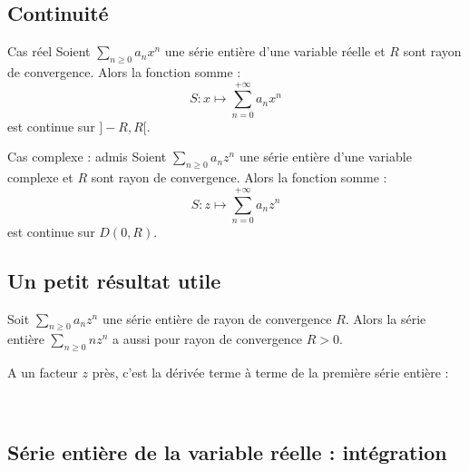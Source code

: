 \documentclass[french,11pt,twoside]{VcCours}
\begin{document}
\subsection{Continuité}

\begin{Theoreme}{Cas réel} Soient $\sum_{n \geq 0} a_n x^n$ une série entière d'une variable réelle et $R$ sont rayon de convergence. Alors la fonction somme :
$$ S : x \mapsto \sum_{n=0}^{+ \infty} a_n x^n $$
est continue sur $]-R,R[$.
\end{Theoreme}

\begin{Demonstration}{}
\vspace*{ 4cm}
\end{Demonstration}

\begin{Theoreme}{Cas complexe : admis} Soient $\sum_{n \geq 0} a_n z^n$ une série entière d'une variable complexe et $R$ sont rayon de convergence. Alors la fonction somme :
$$ S : z \mapsto \sum_{n=0}^{+ \infty} a_n z^n $$
est continue sur $D(0,R)$.
\end{Theoreme}

\subsection{Un petit résultat utile}

\begin{Proposition}{} Soit $\sum_{n \geq 0} a_n z^n$ une série entière de rayon de convergence $R$. Alors la série entière $\sum_{n \geq 0} n z^n$ a aussi pour rayon de convergence $R>0$.
\end{Proposition}

\begin{Remarque}{} A un facteur $z$ près, c'est la \og{} dérivée terme à terme \fg de la première série entière :

\vspace*{3cm}~
\end{Remarque}

\begin{Demonstration}{}

\newpage

\vspace*{ 5.5cm}
\end{Demonstration} 



\subsection{Série entière de la variable réelle : intégration}
\end{document}
